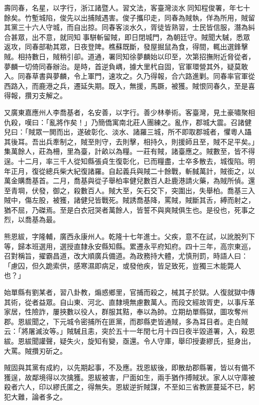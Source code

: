 \begin{pinyinscope}
壽同春，名星，以字行，浙江諸暨人。習文法，客臺灣淡水同知程俊署，年七十餘矣。竹塹城陷，俊先以出捕賊遇害。俊子攜印走，同春為賊執，佯為所用，賊留其黨三十六人守城，而自出掠。同春客淡水久，胥徒皆熟習，士民皆信服，潛為糾合甚眾，出不意，就同知事駢斬留賊，即日閉城門，為朝廷守。賊聞大駴，悉眾返攻，同春部勒其眾，日夜登陴。樵蘇既斷，發屋掘鼠為食，得間，輒出選鋒擊賊。相持數日，賊稍引卻。道通，署同知徐夢麟始以印至，次第招撫附近脅從者，夢麟一切倚同春辦治。是時，首逆負嵎，據大里杙自固，官軍環營其外，疑莫敢入。同春草書與夢麟，令上軍門，速攻之。久乃得報，合六路進剿。同春率官軍從西路入，而鹿港之兵，遷延失期。既入，無援，馬蹶，被獲。賊恨同春久，至是喜得報，攢刃支解之。

又廣東嘉應州人李喬基者，名安善，以字行。善少林拳術。客臺灣，見土豪嘯聚相仇殺，嘆曰：「亂將作矣！」乃簡僑寓南北莊人團練之。亂作，郡城大震。召諸健兒曰：「賊眾一閧而出，遂破彰化、淡水、諸羅三城，所不即取郡城者，懼粵人躡其後耳。吾出兵牽制之，賊至則守，去則擊，相持久，則援師且至，賊不足平矣。」集萬餘人，莊為柵，里為臺，計畝以為糧。一莊有賊，諸臺應之。賊數至，皆不得逞。十二月，率三千人從知縣張貞生復彰化，已而糧盡，士卒多散去，城復陷。明年正月，復從總兵柴大紀復諸羅。自起義兵與賊二十餘戰，斬馘萬計，賊銜之，以萬金購喬基首。二月，喬基與從子舉柏率健兒數百人赴鹿港請火藥，為賊所偵。還至青堈，伏發，御之，殺數百人。賊大至，矢石交下，突圍出，失舉柏。喬基三入賊中，傷左股，被獲，諸健兒皆戰死。賊誘喬基降，罵賊，賊斷其舌，縛而射之，猶不屈，乃磔焉。至是白衣冠哭者萬餘人，皆誓不與爽賊俱生也。是役也，死事之烈，以喬基為最。

熊恩紱，字隆輔，廣西永康州人。乾隆十七年進士。父疾，意不在試，以訛脫列下等，歸本班選用，選授直隸永安縣知縣。累遷永平府知府。四十三年，高宗東巡，召對稱旨，擢霸昌道，改大順廣兵備道。為政務持大體，尤慎刑罰，時語人曰：「慮囚，但久跪索供，感寒濕即病足，或發他疾，皆足致死，豈獨三木能斃人也？」

始單縣有劉某者，習八卦教，煽惑鄉里，官捕而殺之，械其子於獄。人復就獄中傳其術，從者益眾。自山東、河北、直隸境無慮數萬人。而段文經故胥吏，以事斥革家居，性險詐，屢挾數以役人，群服其黠，奉以為帥。立期劫單縣獄，圖攻奪州郡。恩紱聞之，下元城令密捕所在匪黨，而郡縣吏皆通賊，多為耳目者。走白賊云：「將屠滅汝等。」賊駴且恚，突於五十一年閏七月十四日夜半毀道署，入，殺恩紱。恩紱聞讙聲，疑失火，旋知有變，亟還。令人守庫，舉印授妻繆氏，挺身出，大罵。賊攢刃斫之。

賊固與其黨有成約，以先期起事，不及應。戕恩紱後，即散劫郡縣署，皆以有備不獲逞，故鄰境得以次擒獲。恩紱被害，尸面如生，兩手猶作搏賊狀。家人以守庫被殺者六人，印以繆氏匿之，得無失。恩紱逆折賊謀，不至如三省教匪蔓延不已，躬犯大難，論者多之。


\end{pinyinscope}
